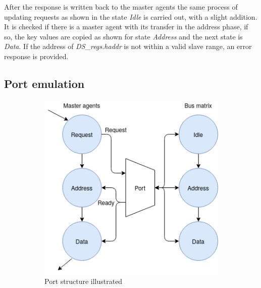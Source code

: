 After the response is written back to the master agents the same process of updating requests as shown in the state \textit{Idle} is carried out, with a slight addition. It is checked if there is a master agent with its transfer in the address phase, if so, the key values are copied as shown for state \textit{Address} and the next state is \textit{Data}. If the address of \textit{DS\_regs.haddr} is not within a valid slave range, an error response is provided.    


\subsection{Port emulation}
\begin{figure}[hbt]
 \centering
 \begin{subfigure}[b]{0.4\linewidth}
 \includegraphics[width=\linewidth]{figs/ESL/port_em.png}
 \caption{Port structure illustrated}
 \end{subfigure}
 \begin{subfigure}[b]{0.3\linewidth}

\end{subfigure}
\end{figure}
